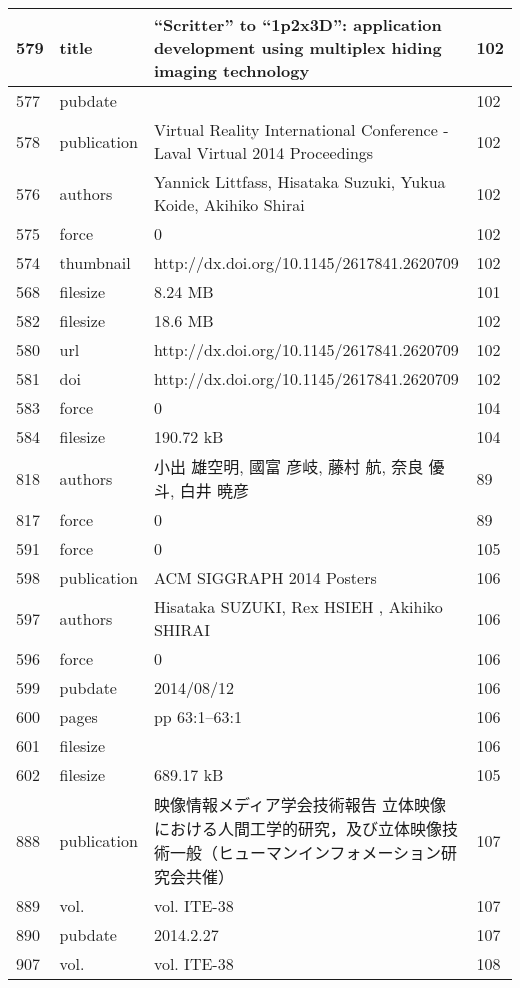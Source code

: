 \begin{longtable}{|l|l|l|l|}
579 & title & “Scritter” to “1p2x3D”: application development using multiplex hiding imaging technology & 102 \\ \hline 
577 & pubdate &  & 102 \\ \hline 
578 & publication & Virtual Reality International Conference - Laval Virtual 2014 Proceedings  & 102 \\ \hline 
576 & authors & Yannick Littfass, Hisataka Suzuki, Yukua Koide, Akihiko Shirai & 102 \\ \hline 
575 & force & 0 & 102 \\ \hline 
574 & thumbnail & http://dx.doi.org/10.1145/2617841.2620709  & 102 \\ \hline 
568 & filesize & 8.24 MB & 101 \\ \hline 
582 & filesize & 18.6 MB & 102 \\ \hline 
580 & url & http://dx.doi.org/10.1145/2617841.2620709  & 102 \\ \hline 
581 & doi & http://dx.doi.org/10.1145/2617841.2620709  & 102 \\ \hline 
583 & force & 0 & 104 \\ \hline 
584 & filesize & 190.72 kB & 104 \\ \hline 
818 & authors & 小出 雄空明, 國富 彦岐, 藤村 航, 奈良 優斗, 白井 暁彦 & 89 \\ \hline 
817 & force & 0 & 89 \\ \hline 
591 & force & 0 & 105 \\ \hline 
598 & publication & ACM SIGGRAPH 2014 Posters & 106 \\ \hline 
597 & authors & Hisataka SUZUKI, Rex HSIEH , Akihiko SHIRAI & 106 \\ \hline 
596 & force & 0 & 106 \\ \hline 
599 & pubdate & 2014/08/12 & 106 \\ \hline 
600 & pages & pp 63:1--63:1 & 106 \\ \hline 
601 & filesize &  & 106 \\ \hline 
602 & filesize & 689.17 kB & 105 \\ \hline 
888 & publication & 映像情報メディア学会技術報告 立体映像における人間工学的研究，及び立体映像技術一般（ヒューマンインフォメーション研究会共催）  & 107 \\ \hline 
889 & vol. & vol. ITE-38 & 107 \\ \hline 
890 & pubdate & 2014.2.27  & 107 \\ \hline 
907 & vol. & vol. ITE-38 & 108 \\ \hline 

\end{longtable}
